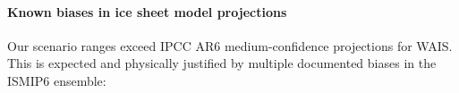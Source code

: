 \documentclass[12pt]{article}
\newcommand{\subsubsubsection}[1]{\paragraph{#1}\mbox{}\par}
\begin{document}

\subsubsubsection{Known biases in ice sheet model projections}

Our scenario ranges exceed IPCC AR6 medium-confidence projections for WAIS. This is expected and physically justified by multiple documented biases in the ISMIP6 ensemble:
\end{document}
